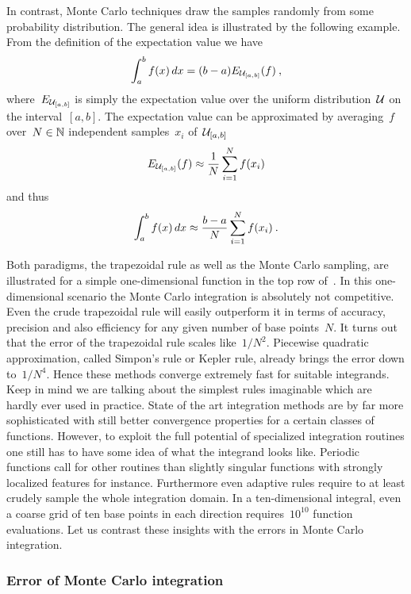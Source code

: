 In contrast, Monte Carlo techniques draw the samples randomly from some
probability distribution. The general idea is illustrated by the following
example. From the definition of the expectation value we have
%
\begin{equation}\label{mcsimple}
  \int_a^b f(x) \,dx = (b-a) E_{\mathcal{U}_{[a,b]}}(f)\:,
\end{equation}
%
where~$E_{\mathcal{U}_{[a,b]}}$ is simply the expectation value over the uniform
distribution~$\mathcal{U}$ on the interval~$[a,b]$. The expectation value can be
approximated by averaging~$f$ over~$N \in \mathbb{N}$ independent samples~${x_i}$
of~$\mathcal{U}_{[a,b]}$
%
\begin{equation}\label{evapprox}
  E_{\mathcal{U}_{[a,b]}}(f) \approx \frac{1}{N} \sum_{i=1}^N f(x_i)
\end{equation}
%
and thus
%
\begin{equation}\label{mcsapprox}
  \int_a^b f(x) \,dx \approx \frac{b-a}{N} \sum_{i=1}^N f(x_i)\:.
\end{equation}

Both paradigms, the trapezoidal rule as well as the Monte Carlo sampling, are
illustrated for a simple one-dimensional function in the top row
of~. In this one-dimensional scenario the Monte Carlo
integration is absolutely not competitive. Even the crude trapezoidal rule will
easily outperform it in terms of accuracy, precision and also efficiency for any
given number of base points~$N$. It turns out that the error of the trapezoidal
rule scales like~$1/N^2$. Piecewise quadratic approximation, called Simpon's
rule or Kepler rule, already brings the error down to~$1/N^4$. Hence these
methods converge extremely fast for suitable integrands. Keep in mind we are
talking about the simplest rules imaginable which are hardly ever used in
practice. State of the art integration methods are by far more sophisticated
with still better convergence properties for a certain classes of functions.
However, to exploit the full potential of specialized integration routines one
still has to have some idea of what the integrand looks like. Periodic functions
call for other routines than slightly singular functions with strongly localized
features for instance. Furthermore even adaptive rules require to at least
crudely sample the whole integration domain. In a ten-dimensional integral, even
a coarse grid of ten base points in each direction requires~$10^{10}$ function
evaluations. Let us contrast these insights with the errors in Monte Carlo
integration.

\subsubsection{Error of Monte Carlo integration}

